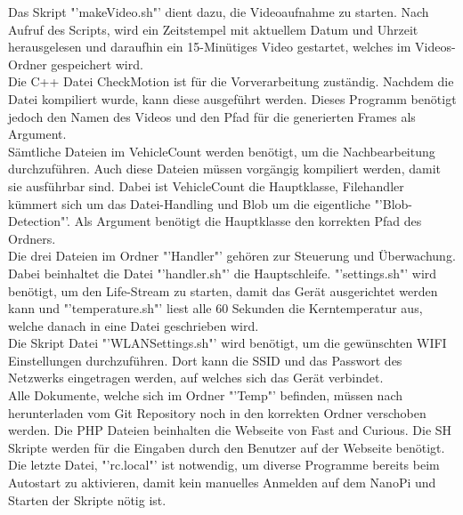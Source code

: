 Das Skript "'makeVideo.sh"' dient dazu, die Videoaufnahme zu starten. Nach Aufruf des Scripts, wird ein Zeitstempel mit aktuellem Datum und Uhrzeit herausgelesen und daraufhin ein 15-Minütiges Video gestartet, welches im Videos-Ordner gespeichert wird.\\

Die C++ Datei CheckMotion ist für die Vorverarbeitung zuständig. Nachdem die Datei kompiliert wurde, kann diese ausgeführt werden. Dieses Programm benötigt jedoch den Namen des Videos und den Pfad für die generierten Frames als Argument.\\

Sämtliche Dateien im VehicleCount werden benötigt, um die Nachbearbeitung durchzuführen. Auch diese Dateien müssen vorgängig kompiliert werden, damit sie ausführbar sind. Dabei ist VehicleCount die Hauptklasse, Filehandler kümmert sich um das Datei-Handling und Blob um die eigentliche "'Blob-Detection"'. Als Argument benötigt die Hauptklasse den korrekten Pfad des Ordners.\\

Die drei Dateien im Ordner "'Handler"' gehören zur Steuerung und Überwachung. Dabei beinhaltet die Datei "'handler.sh"' die Hauptschleife. "'settings.sh"' wird benötigt, um den Life-Stream zu starten, damit das Gerät ausgerichtet werden kann und "'temperature.sh"' liest alle 60 Sekunden die Kerntemperatur aus, welche danach in eine Datei geschrieben wird.\\

Die Skript Datei "'WLANSettings.sh"' wird benötigt, um die gewünschten WIFI Einstellungen durchzuführen. Dort kann die SSID und das Passwort des Netzwerks eingetragen werden, auf welches sich das Gerät verbindet.\\

Alle Dokumente, welche sich im Ordner "'Temp"' befinden, müssen nach herunterladen vom Git Repository noch in den korrekten Ordner verschoben werden. Die PHP Dateien beinhalten die Webseite von Fast and Curious. Die SH Skripte werden für die Eingaben durch den Benutzer auf der Webseite benötigt. Die letzte Datei, "'rc.local"' ist notwendig, um diverse Programme bereits beim Autostart zu aktivieren, damit kein manuelles Anmelden auf dem NanoPi und Starten der Skripte nötig ist.\\

